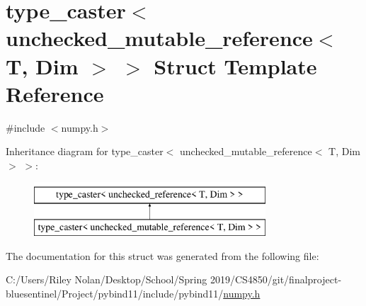 \hypertarget{structtype__caster_3_01unchecked__mutable__reference_3_01_t_00_01_dim_01_4_01_4}{}\section{type\+\_\+caster$<$ unchecked\+\_\+mutable\+\_\+reference$<$ T, Dim $>$ $>$ Struct Template Reference}
\label{structtype__caster_3_01unchecked__mutable__reference_3_01_t_00_01_dim_01_4_01_4}


{\ttfamily \#include $<$numpy.\+h$>$}

Inheritance diagram for type\+\_\+caster$<$ unchecked\+\_\+mutable\+\_\+reference$<$ T, Dim $>$ $>$\+:\begin{figure}[H]
\begin{center}
\leavevmode
\includegraphics[height=2.000000cm]{structtype__caster_3_01unchecked__mutable__reference_3_01_t_00_01_dim_01_4_01_4}
\end{center}
\end{figure}


The documentation for this struct was generated from the following file\+:\begin{DoxyCompactItemize}
\item 
C\+:/\+Users/\+Riley Nolan/\+Desktop/\+School/\+Spring 2019/\+C\+S4850/git/finalproject-\/bluesentinel/\+Project/pybind11/include/pybind11/\mbox{\hyperlink{numpy_8h}{numpy.\+h}}\end{DoxyCompactItemize}
